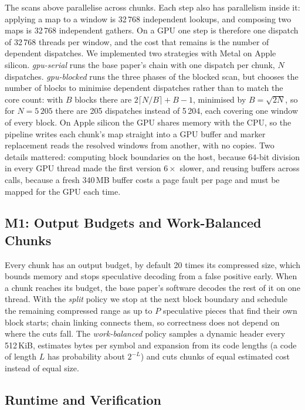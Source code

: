 \documentclass[conference]{IEEEtran}
\begin{document}
The scans above parallelise across chunks. Each step also has parallelism inside it:
applying a map to a window is 32\,768 independent lookups, and composing two maps is
32\,768 independent gathers. On a GPU one step is therefore one dispatch of 32\,768
threads per window, and the cost that remains is the number of dependent dispatches.
We implemented two strategies with Metal on Apple silicon. \emph{gpu-serial} runs the
base paper's chain with one dispatch per chunk, $N$ dispatches. \emph{gpu-blocked}
runs the three phases of the blocked scan, but chooses the number of blocks to
minimise dependent dispatches rather than to match the core count: with $B$ blocks
there are $2\lceil N/B\rceil + B - 1$, minimised by $B = \sqrt{2N}$, so for
$N = 5\,205$ there are 205 dispatches instead of 5\,204, each covering one window of
every block. On Apple silicon the GPU shares memory with the CPU, so the pipeline
writes each chunk's map straight into a GPU buffer and marker replacement reads the
resolved windows from another, with no copies. Two details mattered: computing block
boundaries on the host, because 64-bit division in every GPU thread made the first
version $6\times$ slower, and reusing buffers across calls, because a fresh 340\,MB
buffer costs a page fault per page and must be mapped for the GPU each time.

\subsection{M1: Output Budgets and Work-Balanced Chunks}

Every chunk has an output budget, by default 20 times its compressed size, which
bounds memory and stops speculative decoding from a false positive early. When a
chunk reaches its budget, the base paper's software decodes the rest of it on one
thread. With the \emph{split} policy we stop at the next block boundary and schedule
the remaining compressed range as up to $P$ speculative pieces that find their own
block starts; chain linking connects them, so correctness does not depend on where
the cuts fall. The \emph{work-balanced} policy samples a dynamic header every
512\,KiB, estimates bytes per symbol and expansion from its code lengths (a code of
length $L$ has probability about $2^{-L}$) and cuts chunks of equal estimated cost
instead of equal size.

\subsection{Runtime and Verification}
\end{document}

